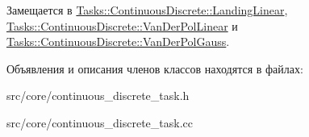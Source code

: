 Замещается в \hyperlink{class_tasks_1_1_continuous_discrete_1_1_landing_linear_a783147d41d5d8dff4facd246fc064bb4}{Tasks\+::\+Continuous\+Discrete\+::\+Landing\+Linear}, \hyperlink{class_tasks_1_1_continuous_discrete_1_1_van_der_pol_linear_a6d2f1c4c12551eda7eb97322335960ef}{Tasks\+::\+Continuous\+Discrete\+::\+Van\+Der\+Pol\+Linear} и \hyperlink{class_tasks_1_1_continuous_discrete_1_1_van_der_pol_gauss_addb8066d1f4701c0c453d07ffa8631ff}{Tasks\+::\+Continuous\+Discrete\+::\+Van\+Der\+Pol\+Gauss}.



Объявления и описания членов классов находятся в файлах\+:\begin{DoxyCompactItemize}
\item 
src/core/continuous\+\_\+discrete\+\_\+task.\+h\item 
src/core/continuous\+\_\+discrete\+\_\+task.\+cc\end{DoxyCompactItemize}
